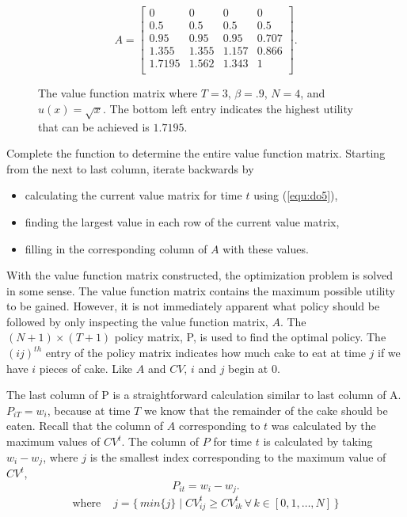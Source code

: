 \begin{figure}[H]
\[
A =
\begin{bmatrix}
0 & 0 & 0 & 0 \\
0.5 & 0.5 & 0.5 & 0.5 \\
0.95 & 0.95 & 0.95 & 0.707 \\
1.355 & 1.355 & 1.157 & 0.866 \\
1.7195 & 1.562 & 1.343 & 1 \\
\end{bmatrix}
.
\]
\caption{The value function matrix where $T=3$, $\beta=.9$, $N=4$, and $u(x) = \sqrt{x}$. The bottom left entry indicates the highest utility that can be achieved is $1.7195$.}
\label{fig:2nd_val_func_matrix}
\end{figure}


\begin{problem}
Complete the function  to determine the entire value function matrix.
Starting from the next to last column, iterate backwards by
\begin{itemize}
\item calculating the current value matrix for time $t$ using (\ref{equ:do5}),
\item finding the largest value in each row of the current value matrix,
\item filling in the corresponding column of $A$ with these values.
\end{itemize}
\end{problem}

With the value function matrix constructed, the optimization problem is solved in some sense.
The value function matrix contains the maximum possible utility to be gained.
However, it is not immediately apparent what policy should be followed by only inspecting the value function matrix, $A$.
The $(N+1) \times (T+1)$ policy matrix, P, is used to find the optimal policy.
The $(ij)^{th}$ entry of the policy matrix indicates how much cake to eat at time $j$ if we have $i$ pieces of cake.
Like $A$ and $CV$, $i$ and $j$ begin at $0$.

The last column of P is a straightforward calculation similar to last column of A.
$P_{iT} = w_i$, because at time $T$ we know that the remainder of the cake should be eaten.
Recall that the column of $A$ corresponding to $t$ was calculated by the maximum values of $CV^{t}$.
The column of $P$ for time $t$ is calculated by taking $w_i - w_j$, where $j$ is the smallest index corresponding to the maximum value of $CV^{t}$,
\[
P_{it} = w_i - w_j.
\]
\begin{align*}
\mbox{where} \, \, & j = \{\, min\{j\} \mid CV_{ij}^t \geq CV_{ik}^t \, \forall \, k \in \left[0,1, \ldots , N \right] \,\}
\end{align*}

